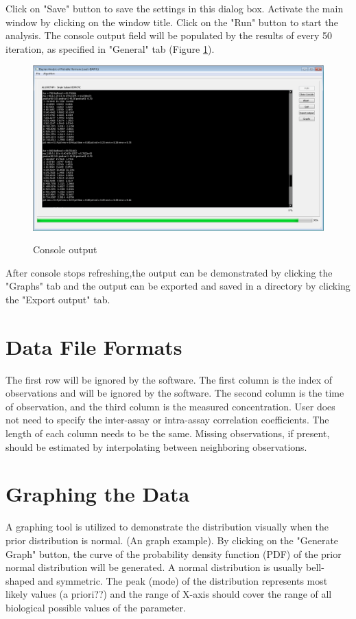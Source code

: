 \documentclass[11pt]{book}
\begin{document}
Click on "Save" button to save the settings in this dialog box.  Activate the main window by clicking on the window title.  Click on the "Run" button to start the analysis.  The console output field will be populated by the results of every 50 iteration, as specified in "General" tab (Figure \ref{consoleoutput}).
\begin{figure}
  \centering
  \includegraphics[width=\textwidth]{consoleoutput.PNG}\\
  \caption{Console output}\label{consoleoutput}
\end{figure}

After console stops refreshing,the output can be demonstrated by clicking the "Graphs" tab and the output can be exported and saved in  a directory by clicking the "Export output" tab.

\section{Data File Formats}
The first row will be ignored by the software.
The first column is the index of observations and will be ignored by the software. The second column is the time of observation, and the third column is the measured concentration. User does not need to specify the inter-assay or intra-assay correlation coefficients. The length of each column needs to be the same.  Missing observations, if present, should be estimated by interpolating between neighboring observations.
\section{Graphing the Data}
A graphing tool is utilized to demonstrate the  distribution visually when the prior distribution is normal. (An graph example). By clicking on the "Generate Graph" button, the curve of the probability density function (PDF) of the prior normal distribution will be generated. A normal distribution is usually bell-shaped and symmetric. The peak (mode) of the distribution represents most likely values (a priori??) and the range of X-axis should cover the range of all biological possible values of the parameter.
\end{document}

